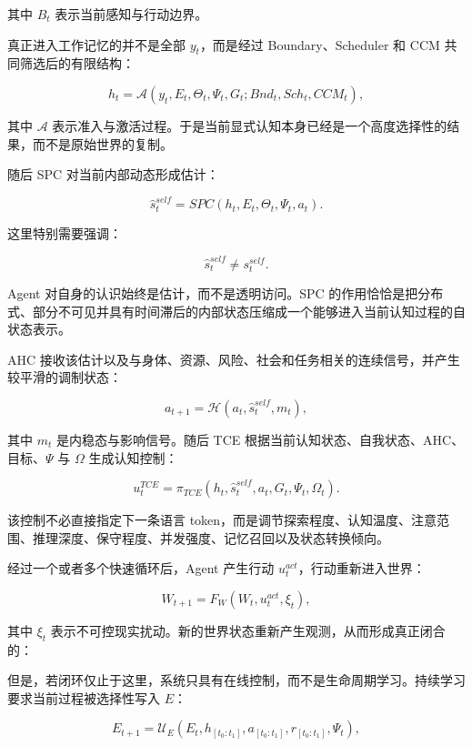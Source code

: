 其中 $B_t$ 表示当前感知与行动边界。

真正进入工作记忆的并不是全部 $y_t$，而是经过 Boundary、Scheduler 和 CCM 共同筛选后的有限结构：

\[
h_t
=
\mathcal{A}
\left(
y_t,
E_t,
\Theta_t,
\Psi_t,
G_t;
Bnd_t,
Sch_t,
CCM_t
\right),
\]

其中 $\mathcal{A}$ 表示准入与激活过程。于是当前显式认知本身已经是一个高度选择性的结果，而不是原始世界的复制。

随后 SPC 对当前内部动态形成估计：

\[
\hat{s}^{self}_t
=
SPC
\left(
h_t,E_t,\Theta_t,\Psi_t,a_t
\right).
\]

这里特别需要强调：

\[
\boxed{
\hat{s}^{self}_t
\neq
s^{self}_t.
}
\]

Agent 对自身的认识始终是估计，而不是透明访问。SPC 的作用恰恰是把分布式、部分不可见并具有时间滞后的内部状态压缩成一个能够进入当前认知过程的自状态表示。

AHC 接收该估计以及与身体、资源、风险、社会和任务相关的连续信号，并产生较平滑的调制状态：

\[
a_{t+1}
=
\mathcal{H}
\left(
a_t,
\hat{s}^{self}_t,
m_t
\right),
\]

其中 $m_t$ 是内稳态与影响信号。随后 TCE 根据当前认知状态、自我状态、AHC、目标、$\Psi$ 与 $\Omega$ 生成认知控制：

\[
u^{TCE}_t
=
\pi_{TCE}
\left(
h_t,
\hat{s}^{self}_t,
a_t,
G_t,
\Psi_t,
\Omega_t
\right).
\]

该控制不必直接指定下一条语言 token，而是调节探索程度、认知温度、注意范围、推理深度、保守程度、并发强度、记忆召回以及状态转换倾向。

经过一个或者多个快速循环后，Agent 产生行动 $u^{act}_t$，行动重新进入世界：

\[
W_{t+1}
=
F_W(W_t,u^{act}_t,\xi_t),
\]

其中 $\xi_t$ 表示不可控现实扰动。新的世界状态重新产生观测，从而形成真正闭合的：

\begin{statementbox}
\centering
{}
\end{statementbox}

但是，若闭环仅止于这里，系统只具有在线控制，而不是生命周期学习。持续学习要求当前过程被选择性写入 $E$：

\[
E_{t+1}
=
\mathcal{U}_E
\left(
E_t,
h_{[t_0:t_1]},
a_{[t_0:t_1]},
r_{[t_0:t_1]},
\Psi_t
\right),
\]

